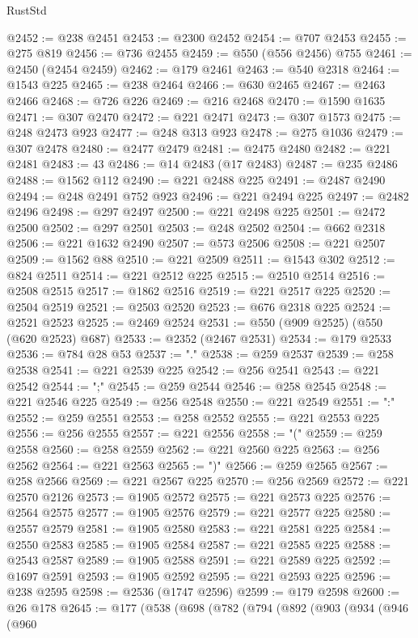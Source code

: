 \begin{lexlean}{RustStd}
\begin{coremodule}
@2452 := @238 @2451
@2453 := @2300 @2452
@2454 := @707 @2453
@2455 := @275 @819
@2456 := @736 @2455
@2459 := @550 (@556 @2456) @755
@2461 := @2450 (@2454 @2459)
@2462 := @179 @2461
@2463 := @540 @2318
@2464 := @1543 @225
@2465 := @238 @2464
@2466 := @630 @2465
@2467 := @2463 @2466
@2468 := @726 @226
@2469 := @216 @2468
@2470 := @1590 @1635
@2471 := @307 @2470
@2472 := @221 @2471
@2473 := @307 @1573
@2475 := @248 @2473 @923
@2477 := @248 @313 @923
@2478 := @275 @1036
@2479 := @307 @2478
@2480 := @2477 @2479
@2481 := @2475 @2480
@2482 := @221 @2481
@2483 := 43
@2486 := @14 @2483 (@17 @2483)
@2487 := @235 @2486
@2488 := @1562 @112
@2490 := @221 @2488 @225
@2491 := @2487 @2490
@2494 := @248 @2491 @752 @923
@2496 := @221 @2494 @225
@2497 := @2482 @2496
@2498 := @297 @2497
@2500 := @221 @2498 @225
@2501 := @2472 @2500
@2502 := @297 @2501
@2503 := @248 @2502
@2504 := @662 @2318
@2506 := @221 @1632 @2490
@2507 := @573 @2506
@2508 := @221 @2507
@2509 := @1562 @88
@2510 := @221 @2509
@2511 := @1543 @302
@2512 := @824 @2511
@2514 := @221 @2512 @225
@2515 := @2510 @2514
@2516 := @2508 @2515
@2517 := @1862 @2516
@2519 := @221 @2517 @225
@2520 := @2504 @2519
@2521 := @2503 @2520
@2523 := @676 @2318 @225
@2524 := @2521 @2523
@2525 := @2469 @2524
@2531 := @550 (@909 @2525) (@550 (@620 @2523) @687)
@2533 := @2352 (@2467 @2531)
@2534 := @179 @2533
@2536 := @784 @28 @53
@2537 := "."
@2538 := @259 @2537
@2539 := @258 @2538
@2541 := @221 @2539 @225
@2542 := @256 @2541
@2543 := @221 @2542
@2544 := ";"
@2545 := @259 @2544
@2546 := @258 @2545
@2548 := @221 @2546 @225
@2549 := @256 @2548
@2550 := @221 @2549
@2551 := ":"
@2552 := @259 @2551
@2553 := @258 @2552
@2555 := @221 @2553 @225
@2556 := @256 @2555
@2557 := @221 @2556
@2558 := "("
@2559 := @259 @2558
@2560 := @258 @2559
@2562 := @221 @2560 @225
@2563 := @256 @2562
@2564 := @221 @2563
@2565 := ")"
@2566 := @259 @2565
@2567 := @258 @2566
@2569 := @221 @2567 @225
@2570 := @256 @2569
@2572 := @221 @2570 @2126
@2573 := @1905 @2572
@2575 := @221 @2573 @225
@2576 := @2564 @2575
@2577 := @1905 @2576
@2579 := @221 @2577 @225
@2580 := @2557 @2579
@2581 := @1905 @2580
@2583 := @221 @2581 @225
@2584 := @2550 @2583
@2585 := @1905 @2584
@2587 := @221 @2585 @225
@2588 := @2543 @2587
@2589 := @1905 @2588
@2591 := @221 @2589 @225
@2592 := @1697 @2591
@2593 := @1905 @2592
@2595 := @221 @2593 @225
@2596 := @238 @2595
@2598 := @2536 (@1747 @2596)
@2599 := @179 @2598
@2600 := @26 @178
@2645 := @177
    (@538
      (@698
        (@782
          (@794
            (@892
              (@903
                (@934
                  (@946
                    (@960

\end{coremodule}
\end{lexlean}
